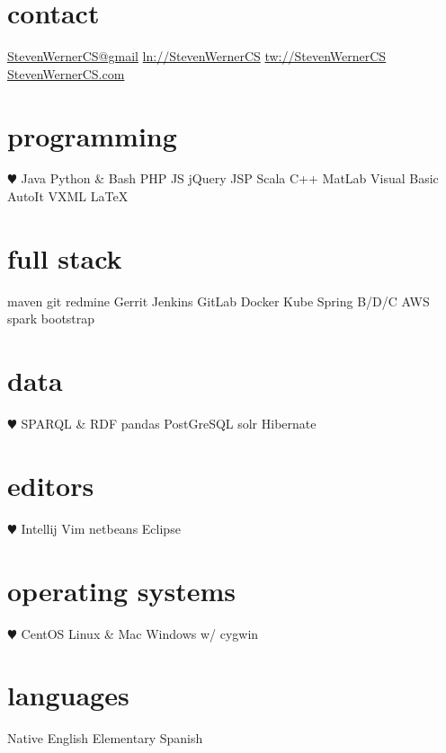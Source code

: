\documentclass[]{friggeri-cv} %
\begin{document}


\begin{aside1} 
\section{contact}
\href{mailto:StevenWernerCS@gmail.com}{StevenWernerCS@gmail}
\href{http://linkedin.com/in/StevenWernerCS}{ln://StevenWernerCS}
\href{http://www.twitter.com/StevenWernerCS}{tw://StevenWernerCS}
\href{http://www.StevenWernerCS.com}{StevenWernerCS.com}
\section{programming}
{\color{red} $\varheartsuit$} Java Python \& Bash
PHP JS jQuery JSP
Scala C++ MatLab 
Visual Basic AutoIt 
VXML {\selectfont \LaTeX}
\section{full stack}
maven git
redmine Gerrit
Jenkins GitLab
Docker Kube
Spring B/D/C
AWS spark
bootstrap
\section{data}
{\color{red} $\varheartsuit$} SPARQL \& RDF
pandas
PostGreSQL
solr Hibernate
\section{editors}
{\color{red} $\varheartsuit$} Intellij Vim
netbeans Eclipse
\section{operating systems}
{\color{red} $\varheartsuit$} CentOS Linux \& Mac 
Windows w/ cygwin
\section{languages}
Native English
Elementary Spanish
\end{aside1}
\end{document}
